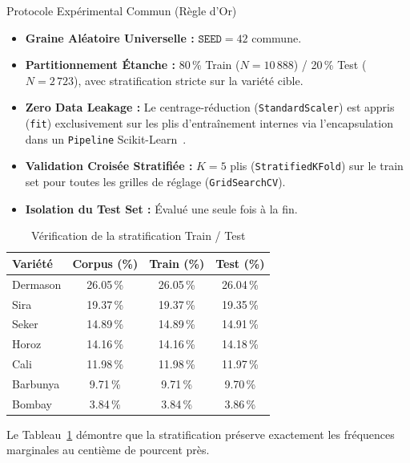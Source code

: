 \documentclass[10pt,a4paper,twocolumn]{article}
\begin{document}
\begin{protocolbox}{Protocole Expérimental Commun (Règle d'Or)}
\begin{itemize}\setlength{\itemsep}{1.5pt}\setlength{\parskip}{0pt}\small
    \item \textbf{Graine Aléatoire Universelle :} $\texttt{SEED} = 42$ commune.
    \item \textbf{Partitionnement Étanche :} 80\,\% Train ($N = 10\,888$) / 20\,\% Test ($N = 2\,723$), avec stratification stricte sur la variété cible.
    \item \textbf{Zero Data Leakage :} Le centrage-réduction (\texttt{StandardScaler}) est appris (\texttt{fit}) exclusivement sur les plis d'entraînement internes via l'encapsulation dans un \texttt{Pipeline} Scikit-Learn~\cite{pedregosa2011scikit}.
    \item \textbf{Validation Croisée Stratifiée :} $K=5$ plis (\texttt{StratifiedKFold}) sur le train set pour toutes les grilles de réglage (\texttt{GridSearchCV}).
    \item \textbf{Isolation du Test Set :} Évalué une seule fois à la fin.
\end{itemize}
\end{protocolbox}

\begin{table}[h]
\centering
\small
\caption{Vérification de la stratification Train / Test}
\label{tab:strat}
\begin{tabular}{@{}lccc@{}}
\toprule
\textbf{Variété} & \textbf{Corpus (\%)} & \textbf{Train (\%)} & \textbf{Test (\%)} \\
\midrule
Dermason & 26.05\,\% & 26.05\,\% & 26.04\,\% \\
Sira     & 19.37\,\% & 19.37\,\% & 19.35\,\% \\
Seker    & 14.89\,\% & 14.89\,\% & 14.91\,\% \\
Horoz    & 14.16\,\% & 14.16\,\% & 14.18\,\% \\
Cali     & 11.98\,\% & 11.98\,\% & 11.97\,\% \\
Barbunya & 9.71\,\%  & 9.71\,\%  & 9.70\,\% \\
Bombay   & 3.84\,\%  & 3.84\,\%  & 3.86\,\% \\
\bottomrule
\end{tabular}
\end{table}

Le Tableau~\ref{tab:strat} démontre que la stratification préserve exactement les fréquences marginales au centième de pourcent près.
\end{document}
